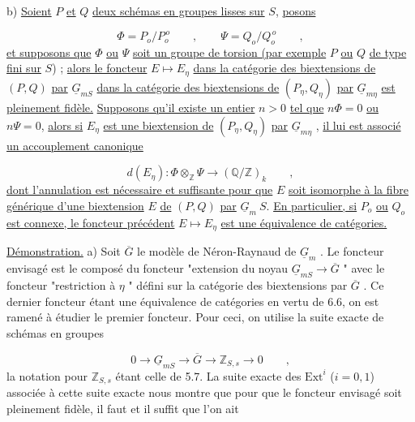 
b)  \underline{Soient} $P$ \underline{et} $Q$ \underline{deux schémas en groupes lisses sur} $S$, \underline{posons}

\begin{equation*}
\Phi = P_o/P_o^{\,o} \qquad , \qquad \Psi = Q_o/Q_o^{\,o} \qquad ,
\end{equation*}
\underline{et supposons que} $\Phi$ \underline{ou} $\Psi$ \underline{soit un groupe de torsion (par exemple} $P$ \underline{ou} $Q$ \underline{de type fini sur} $S$) ; \underline{alors le foncteur} $E \longmapsto E_\eta$ \underline{dans la catégorie des biextensions de} $(P,Q)$ \underline{par} $\underline{G}_{mS}$ \underline{dans la catégorie des biextensions de} $(P_\eta,Q_\eta)$ \underline{par} $\underline{G}_{m\eta}$ \underline{est pleinement fidèle.} \underline{Supposons qu'il existe un entier} $n > 0$ \underline{tel que} $n\Phi=0$ \underline{ou} $n\Psi=0$, \underline{alors si} $E_\eta$ \underline{est une biextension de} $(P_\eta,Q_\eta)$ \underline{par} $\underline{G}_{m\eta}$ , \underline{il lui est associé un accouplement canonique}

\begin{equation}\tag{7.1.2}
d(E_\eta) : \Phi \otimes_{\mathbb{Z}} \Psi \longrightarrow (\mathbb{Q}/\mathbb{Z})_k \qquad ,
\end{equation}
\underline{dont l'annulation est nécessaire et suffisante pour que} $E$ \underline{soit isomorphe à la fibre générique d'une biextension} $E$ \underline{de} $(P,Q)$ \underline{par} $\underline{G}_m\ S$. \underline{En particulier, si} $P_o$ \underline{ou} $Q_o$ \underline{est connexe, le foncteur précédent} $E \longmapsto E_\eta$ \underline{est une équivalence de catégories.}

\underline{Démonstration.}  a)  Soit $\overline{G}$ le modèle de Néron-Raynaud de $\underline{G}_m$ . Le foncteur envisagé est le composé du foncteur "extension du noyau $\underline{G}_{mS} \longrightarrow \overline{G}$ " avec le foncteur "restriction à $\eta$ " défini sur la catégorie des biextensions par $\overline{G}$ . Ce dernier foncteur étant une équivalence de catégories en vertu de 6.6, on est ramené à étudier le premier foncteur. Pour ceci, on utilise la suite exacte de schémas en groupes

\begin{equation}\tag{7.1.3}
0 \longrightarrow \underline{G}_{mS} \longrightarrow \overline{G} \longrightarrow \mathbb{Z}_{S,s} \longrightarrow 0 \qquad ,
\end{equation}
la notation pour $\mathbb{Z}_{S,s}$ étant celle de 5.7. La suite exacte des $\mathrm{Ext}^i$ ($i=0,1$) associée à cette suite exacte nous montre que pour que le foncteur envisagé soit pleinement fidèle, il faut et il suffit que l'on ait 


